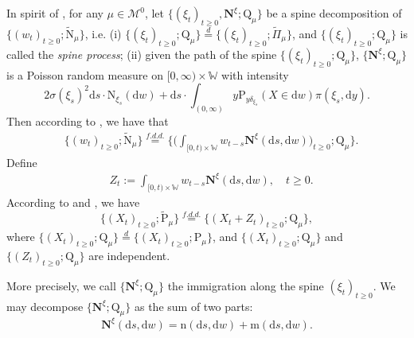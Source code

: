 \documentclass[12pt,a4paper]{amsart}
\numberwithin{equation}{section}
\theoremstyle{plain}
\theoremstyle{definition}
\theoremstyle{remark}
\begin{document}
In spirit of \cite{RenSongSun2020Spine}, for any $\mu\in \mathcal M^0$, let
$\{(\xi_t)_{t\geq 0}, \mathbf N^\xi; \mathrm Q_\mu\}$ be a spine decomposition of $\{(w_t)_{t\geq 0}; \widetilde {\mathrm N}_\mu\}$, i.e.
(i) $\{(\xi_t)_{t\geq 0}; \mathrm Q_\mu\} \overset{d}= \{(\xi_t)_{t\geq 0}; \widetilde \Pi_{\mu} \}$, and $\{(\xi_t)_{t\geq 0}; \mathrm Q_\mu\}$ is called the {\it spine process};
(ii) given the path of the spine
$\{(\xi_t)_{t\geq 0}; \mathrm Q_\mu\}$,
$\{\mathbf N^\xi; \mathrm Q_\mu\}$ is a Poisson random measure on $[0,\infty) \times \mathbb W$ with intensity
$$
2 \sigma(\xi_s)^2 \mathrm ds \cdot \mathrm N_{\xi_s}(\mathrm dw)+ \mathrm ds \cdot \int_{(0,\infty)} y \mathrm P_{y\delta_{\xi_s}}(X\in \mathrm dw) \pi(\xi_s, \mathrm dy).
$$
Then according to \cite{RenSongSun2020Spine}, we have that
\begin{align}
	& \{(w_t)_{t\geq 0}; \widetilde{\mathrm N}_\mu \} \overset{{f.d.d.}} = \Big\{ \Big( \int_{[0,t)\times \mathbb W} w_{t-s} \mathbf N^\xi(\mathrm ds, \mathrm dw) \Big)_{t\geq 0} ; \mathrm Q_\mu\Big\}.
\end{align}
Define\begin{align}
	& Z_t:= \int_{[0,t)\times \mathbb W} w_{t-s} \mathbf N^\xi(\mathrm ds, \mathrm dw), \quad t\geq 0.
\end{align}
According to \cite{RenSongSun2020Spine} and \cite{RenSongYang2016Spine},  we have
\begin{equation}\label{spine-decom1}
	\{(X_t)_{t\geq 0}; \widetilde {\mathrm P}_\mu\} \overset{f.d.d.} = \{ (X_t+ Z_t)_{t\geq 0}; \mathrm Q_\mu\},
\end{equation}
where  $\{(X_t)_{t\geq 0}; \mathrm Q_\mu\} \overset{d} =  \{(X_t)_{t\geq 0}; \mathrm P_\mu\}$,   and $\{(X_t)_{t\geq 0}; \mathrm Q_\mu\} $ and $\{(Z_t)_{t\geq 0}; \mathrm Q_\mu\}$ are independent.

More precisely,
we call $\{\mathbf N^\xi; \mathrm Q_\mu\}$ the immigration along the spine $(\xi_t)_{t\geq 0}$. We may decompose $\{\mathbf N^\xi; \mathrm Q_\mu\}$ as the sum of two parts:
$$
\mathbf N^\xi(\mathrm ds, \mathrm dw)=\mathrm n(\mathrm ds, \mathrm dw)+\mathrm m(\mathrm ds, \mathrm dw).
$$
\end{document}
